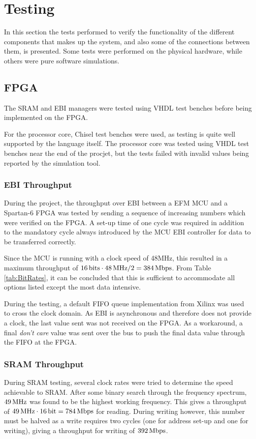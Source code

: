 \section{Testing}

In this section the tests performed to verify the functionality of the different components that makes up the system, and also some of the connections between them, is presented.
Some tests were performed on the physical hardware, while others were pure software simulations.

\subsection{FPGA}
The SRAM and EBI managers were tested using VHDL test benches before being implemented on the FPGA.

For the processor core, Chisel test benches were used, as testing is quite well supported by the language itself.
The processor core was tested using VHDL test benches near the end of the procjet, but the tests failed with invalid values being reported by the simulation tool.

\subsubsection{EBI Throughput} \label{subsec:EbiThroughput}
During the project, the throughput over EBI between a EFM MCU and a Spartan-6 FPGA was tested by sending a sequence of increasing numbers which were verified on the FPGA.
A set-up time of one cycle was required in addition to the mandatory cycle always introduced by the MCU EBI controller for data to be transferred correctly.

Since the MCU is running with a clock speed of 48MHz, this resulted in a maximum throughput of $\unit[16]{bits} \cdot \unit[48]{MHz} / 2 = \unit[384]{Mbps}$.
From Table \ref{tab:BitRates}, it can be concluded that this is sufficient to accommodate all options listed except the most data intensive.

During the testing, a default FIFO queue implementation from Xilinx was used to cross the clock domain.
As EBI is asynchronous and therefore does not provide a clock, the last value sent was not received on the FPGA.
As a workaround, a final \textit{don't care} value was sent over the bus to push the final data value through the FIFO at the FPGA.

\subsubsection{SRAM Throughput} \label{subsec:SramThroughput}
During SRAM testing, several clock rates were tried to determine the speed achievable to SRAM.
After some binary search through the frequency spectrum, $\unit[49]{MHz}$ was found to be the highest working frequency.
This gives a throughput of $\unit[49]{MHz}\cdot\unit[16]{bit} = \unit[784]{Mbps}$ for reading.
During writing however, this number must be halved as a write requires two cycles (one for address set-up and one for writing), giving a throughput for writing of $\unit[392]{Mbps}$.

